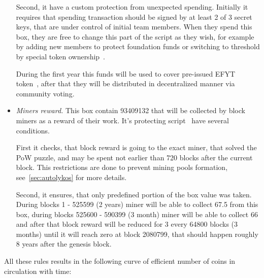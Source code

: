 \begin{itemize}
    Second, it have a custom protection from unexpected spending.
    Initially it requires that spending transaction should be signed by at least 2 of 3 secret keys,
    that are under control of initial team members. When they spend this box, they are free to
    change this part of the script as they wish, for example by adding new members to protect foundation
    funds or switching to threshold by special token ownership~\cite{link to ...}.

    During the first year this funds will be used to cover pre-issued EFYT token~\cite{our website},
    after that they will be distributed in decentralized manner via community voting.


    \item{\em Miners reward.} This box contain 93409132 \Erg{} that will be collected by block miners
    as a reward of their work.
    It's protecting script~\cite{link to corresponding ergo tree} have several conditions.

    First it checks, that block reward is going to the exact miner, that solved the PoW puzzle, and
    may be spent not earlier than 720 blocks after the current block.
    This restrictions are done to prevent mining pools formation, see~\ref{sec:autolykos} for more details.

    Second, it ensures, that only predefined portion of the box value was taken.
    During blocks 1 - 525599 (2 years) miner will be able to collect 67.5 \Erg{} from this box,
    during blocks 525600 - 590399 (3 month) miner will be able to collect 66 \Erg{} and after
    that block reward will be reduced for 3 \Erg{} every 64800 blocks (3 months) until it will reach zero
    at block 2080799, that should happen roughly 8 years after the genesis block.


\end{itemize}

All these rules results in the following curve of efficient number of coins in circulation with time:

